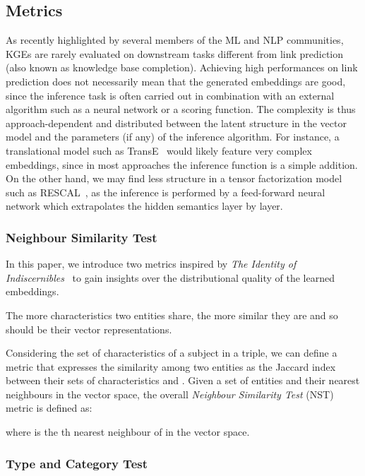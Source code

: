 \documentclass[graybox]{archivesofdatascience}
\begin{document}
\subsection{Metrics}

As recently highlighted by several members of the ML and NLP communities, KGEs are rarely evaluated on downstream tasks different from link prediction (also known as knowledge base completion).
Achieving high performances on link prediction does not necessarily mean that the generated embeddings are good, since the inference task is often carried out in combination with an external algorithm such as a neural network or a scoring function.
The complexity is thus approach-dependent and distributed between the latent structure in the vector model and the parameters (if any) of the inference algorithm.
For instance, a translational model such as TransE~\cite{TransE/bordes2013translating} would likely feature very complex embeddings, since in most approaches the inference function is a simple addition.
On the other hand, we may find less structure in a tensor factorization model such as RESCAL~\cite{nickel2011three}, as the inference is performed by a feed-forward neural network which extrapolates the hidden semantics layer by layer.

\subsubsection{Neighbour Similarity Test}

In this paper, we introduce two metrics inspired by \textit{The Identity of Indiscernibles}~\citep{black1952identity} to gain insights over the distributional quality of the learned embeddings.
\begin{svgraybox}
The more characteristics two entities share, the more similar they are and so should be their vector representations.
\end{svgraybox}
Considering the set of characteristics  of a subject  in a triple, we can define a metric that expresses the similarity among two entities  as the Jaccard index between their sets of characteristics  and .
Given a set of entities  and their  nearest neighbours in the vector space, the overall \textit{Neighbour Similarity Test} (NST) metric is defined as:

where  is the th nearest neighbour of  in the vector space.

\subsubsection{Type and Category Test}
\end{document}
